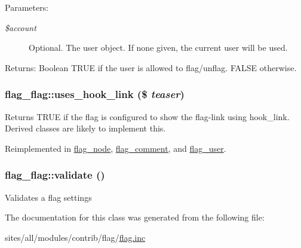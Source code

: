 \begin{Desc}
\item[Parameters:]
\begin{description}
\item[{\em \$account}]Optional. The user object. If none given, the current user will be used.\end{description}
\end{Desc}
\begin{Desc}
\item[Returns:]Boolean TRUE if the user is allowed to flag/unflag. FALSE otherwise. \end{Desc}
\hypertarget{classflag__flag_10e87c5a12cc7b857d388985295bc8ab}{
\subsubsection[{uses\_\-hook\_\-link}]{\setlength{\rightskip}{0pt plus 5cm}flag\_\-flag::uses\_\-hook\_\-link (\$ {\em teaser})}}
\label{classflag__flag_10e87c5a12cc7b857d388985295bc8ab}


Returns TRUE if the flag is configured to show the flag-link using hook\_\-link. Derived classes are likely to implement this. 

Reimplemented in \hyperlink{classflag__node_60653b0f36b6161d0e2ae012ff94319f}{flag\_\-node}, \hyperlink{classflag__comment_fae5770ee7dc6b4fc2ce56e99ac854bf}{flag\_\-comment}, and \hyperlink{classflag__user_279b08bbeb85bdd35710b25e94ebba81}{flag\_\-user}.\hypertarget{classflag__flag_3798da6a05ea42660d511af1421a687f}{
\subsubsection[{validate}]{\setlength{\rightskip}{0pt plus 5cm}flag\_\-flag::validate ()}}
\label{classflag__flag_3798da6a05ea42660d511af1421a687f}


Validates a flag settings 

The documentation for this class was generated from the following file:\begin{CompactItemize}
\item 
sites/all/modules/contrib/flag/\hyperlink{flag_8inc}{flag.inc}\end{CompactItemize}
